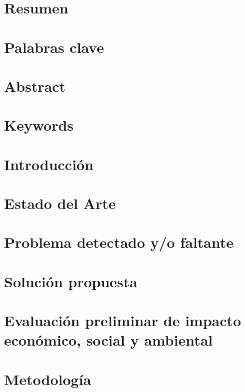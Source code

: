 \documentclass[a4paper,11pt]{article}
\begin{document}


\tableofcontents
\newpage

\section{Resumen}


\section{Palabras clave}

\newpage

\section{Abstract}


\section{Keywords}

\newpage

\section{Introducción}

\newpage

\section{Estado del Arte}

\newpage

\section{Problema detectado y/o faltante}

\newpage

\section{Solución propuesta}

\newpage

\section{Evaluación preliminar de impacto económico, social y ambiental}

\newpage

\section{Metodología}

\newpage
\end{document}
